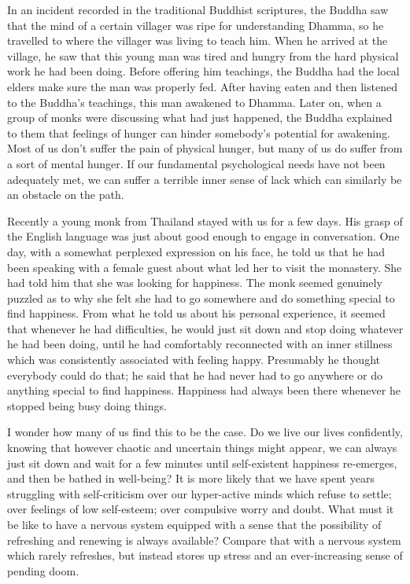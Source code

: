 In an incident recorded in the traditional Buddhist scriptures,\cite{hunger}
the Buddha saw that the mind of a certain villager was ripe for
understanding Dhamma, so he travelled to where the villager was living
to teach him. When he arrived at the village, he saw that this young man
was tired and hungry from the hard physical work he had been doing.
Before offering him teachings, the Buddha had the local elders make sure
the man was properly fed. After having eaten and then listened to the
Buddha's teachings, this man awakened to Dhamma. Later on, when a group
of monks were discussing what had just happened, the Buddha explained to
them that feelings of hunger can hinder somebody's potential for
awakening. Most of us don't suffer the pain of physical hunger, but many
of us do suffer from a sort of mental hunger. If our fundamental
psychological needs have not been adequately met, we can suffer a
terrible inner sense of lack which can similarly be an obstacle on the
path.

\clearpage

\enlargethispage{\baselineskip}

Recently a young monk from Thailand stayed with us for a few days. His
grasp of the English language was just about good enough to engage in
conversation. One day, with a somewhat perplexed expression on his face,
he told us that he had been speaking with a female guest about what led
her to visit the monastery. She had told him that she was looking for
happiness. The monk seemed genuinely puzzled as to why she felt she had
to go somewhere and do something special to find happiness. From what he
told us about his personal experience, it seemed that whenever he had
difficulties, he would just sit down and stop doing whatever he had been
doing, until he had comfortably reconnected with an inner stillness
which was consistently associated with feeling happy. Presumably he
thought everybody could do that; he said that he had never had to go
anywhere or do anything special to find happiness. Happiness had always
been there whenever he stopped being busy doing things.

I wonder how many of us find this to be the case. Do we live our lives
confidently, knowing that however chaotic and uncertain things might
appear, we can always just sit down and wait for a few minutes until
self-existent happiness re-emerges, and then be bathed in well-being? It
is more likely that we have spent years struggling with self-criticism
over our hyper-active minds which refuse to settle; over feelings of low
self-esteem; over compulsive worry and doubt. What must it be like to
have a nervous system equipped with a sense that the possibility of
refreshing and renewing is always available? Compare that with a nervous
system which rarely refreshes, but instead stores up stress and an
ever-increasing sense of pending doom.


